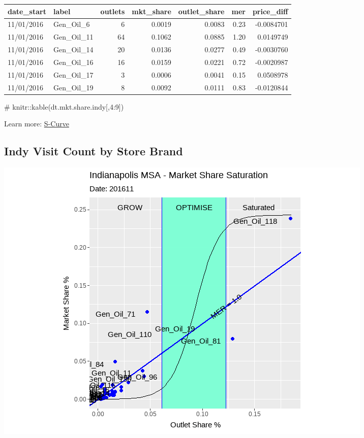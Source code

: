\documentclass[
  letterpaper,
  DIV=11,
  numbers=noendperiod]{scrartcl}
\newenvironment{Shaded}{\begin{snugshade}}{\end{snugshade}}
\newcommand{\CommentTok}[1]{\textcolor[rgb]{0.37,0.37,0.37}{#1}}
\begin{document}
\begin{tabular}{l|l|r|r|r|r|r}
\hline
date\_start & label & outlets & mkt\_share & outlet\_share & mer & price\_diff\\
\hline
11/01/2016 & Gen\_Oil\_6 & 6 & 0.0019 & 0.0083 & 0.23 & -0.0084701\\
\hline
11/01/2016 & Gen\_Oil\_11 & 64 & 0.1062 & 0.0885 & 1.20 & 0.0149749\\
\hline
11/01/2016 & Gen\_Oil\_14 & 20 & 0.0136 & 0.0277 & 0.49 & -0.0030760\\
\hline
11/01/2016 & Gen\_Oil\_16 & 16 & 0.0159 & 0.0221 & 0.72 & -0.0020987\\
\hline
11/01/2016 & Gen\_Oil\_17 & 3 & 0.0006 & 0.0041 & 0.15 & 0.0508978\\
\hline
11/01/2016 & Gen\_Oil\_19 & 8 & 0.0092 & 0.0111 & 0.83 & -0.0120844\\
\hline
\end{tabular}

\begin{Shaded}
\begin{Highlighting}[]
\CommentTok{\# knitr::kable(dt.mkt.share.indy[,4:9])}
\end{Highlighting}
\end{Shaded}

Learn more: \href{https://tinyurl.com/5a59uum9}{S-Curve}

\hypertarget{indy-visit-count-by-store-brand}{%
\subsection{Indy Visit Count by Store
Brand}\label{indy-visit-count-by-store-brand}}

\includegraphics{anim/indy_store_visit.gif}
\end{document}
